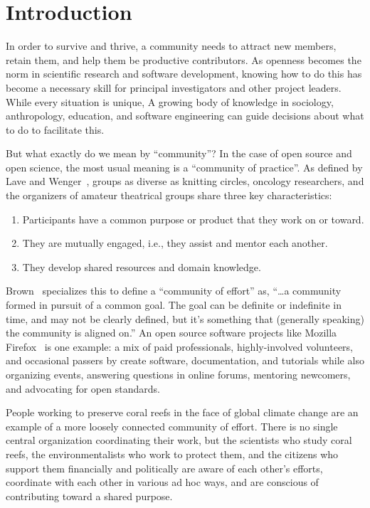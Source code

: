 \documentclass[10pt,letterpaper]{article}
\begin{document}
\section*{Introduction}

In order to survive and thrive,
a community needs to attract new members,
retain them,
and help them be productive contributors.
As openness becomes the norm in scientific research and software development,
knowing how to do this has become a necessary skill for principal investigators and other project leaders.
While every situation is unique,
A growing body of knowledge in sociology, anthropology, education, and software engineering
can guide decisions about what to do to facilitate this.

But what exactly do we mean by ``community''?
In the case of open source and open science,
the most usual meaning is a ``community of practice''.
As defined by Lave and Wenger~\cite{lave1991,wenger1999},
groups as diverse as knitting circles,
oncology researchers,
and the organizers of amateur theatrical groups
share three key characteristics:

\begin{enumerate}

\item Participants have a common purpose or product that they work on or toward.

\item They are mutually engaged, i.e., they assist and mentor each another.

\item They develop shared resources and domain knowledge.

\end{enumerate}

Brown~\cite{brown2019} specializes this to define a ``community of effort'' as,
``{\ldots}a community formed in pursuit of a common goal.
The goal can be definite or indefinite in time,
and may not be clearly defined,
but it's something that (generally speaking) the community is aligned on.''
An open source software projects like Mozilla Firefox~\cite{mozilla} is one example:
a mix of paid professionals,
highly-involved volunteers,
and occasional passers by create software,
documentation,
and tutorials
while also organizing events,
answering questions in online forums,
mentoring newcomers,
and advocating for open standards.

People working to preserve coral reefs in the face of global climate change are an example of
a more loosely connected community of effort.
There is no single central organization coordinating their work,
but the scientists who study coral reefs,
the environmentalists who work to protect them,
and the citizens who support them financially and politically
are aware of each other's efforts,
coordinate with each other in various ad hoc ways,
and are conscious of contributing toward a shared purpose.
\end{document}
